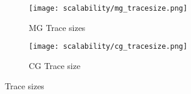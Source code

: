 \begin{figure}
    \centering
    \begin{subfigure}[b]{0.45\textwidth}
        \texttt{[image: scalability/mg\_tracesize.png]}
        \caption{MG Trace sizes}
        \label{fig:mg_trace_size}
    \end{subfigure}
    \medspace
    \begin{subfigure}[b]{0.45\textwidth}
        \texttt{[image: scalability/cg\_tracesize.png]}
        \caption{CG Trace size}
        \label{fig:cg_trace_size}
    \end{subfigure}
    \caption{Trace sizes}
    \label{fig:trace_sizes}
\end{figure}
